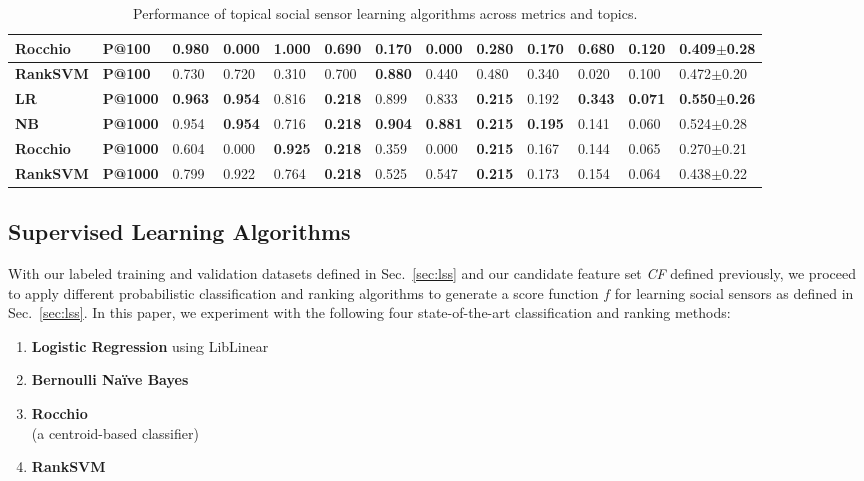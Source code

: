 \begin{table*}[t!]
{{\begin{tabular}{|l|l|l|l|l|l|l|l|l|l|l|l|l|}
\textbf{Rocchio} & \textbf{P@100} & \textbf{0.980} & 0.000 & \textbf{1.000} & 0.690 & 0.170 & 0.000 & 0.280 & 0.170 & 0.680 & 0.120 & 0.409$\pm$0.28 \\ \hline
\textbf{RankSVM} & \textbf{P@100} & 0.730 & 0.720 & 0.310 & 0.700 & \textbf{0.880} & 0.440 & 0.480 & 0.340 & 0.020 & 0.100 & 0.472$\pm$0.20 \\ \hline \hline
\textbf{LR} & \textbf{P@1000} & \textbf{0.963} & \textbf{0.954} & 0.816 & \textbf{0.218} & 0.899 & 0.833 & \textbf{0.215} & 0.192 & \textbf{0.343} & \textbf{0.071} & \textbf{0.550$\pm$0.26} \\ \hline
\textbf{NB} & \textbf{P@1000} & 0.954 & \textbf{0.954} & 0.716 & \textbf{0.218} & \textbf{0.904} & \textbf{0.881} & \textbf{0.215} & \textbf{0.195} & 0.141 & 0.060 & 0.524$\pm$0.28 \\ \hline
\textbf{Rocchio} & \textbf{P@1000} & 0.604 & 0.000 & \textbf{0.925} & \textbf{0.218} & 0.359 & 0.000 & \textbf{0.215} & 0.167 & 0.144 & 0.065 & 0.270$\pm$0.21 \\ \hline
\textbf{RankSVM} & \textbf{P@1000} & 0.799 & 0.922 & 0.764 & \textbf{0.218} & 0.525 & 0.547 & \textbf{0.215} & 0.173 & 0.154 & 0.064 & 0.438$\pm$0.22 \\ \hline
\end{tabular}
}}
\caption{Performance of topical social sensor learning algorithms across metrics and topics.} 
\label{table:results2}
\end{table*}

\subsection{Supervised Learning Algorithms}

With our labeled training and validation datasets defined in
Sec.~\ref{sec:lss} and our candidate feature set \textit{CF} defined
previously, we proceed to apply different probabilistic classification and ranking
algorithms to generate a score function $f$ for learning social sensors
as defined in Sec.~\ref{sec:lss}.  In this paper, we experiment with
the following four state-of-the-art classification and ranking methods:
\begin{enumerate}
\item {\bf Logistic Regression} using LibLinear~\cite{liblinear}
\item {\bf Bernoulli Na\"{i}ve Bayes}~\cite{mccallum98nb}
\item {\bf Rocchio}~\cite{manning_ir}\\(a centroid-based classifier)
\item {\bf RankSVM}~\cite{largescale_ranksvm}
\end{enumerate}

